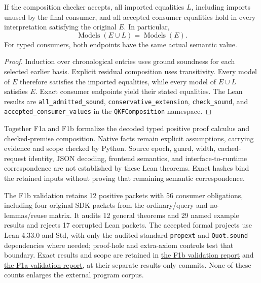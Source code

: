 \begin{theorem}\label{thm:formalcomposition}
If the composition checker accepts, all imported equalities $L$, including imports unused by the final consumer, and all accepted consumer equalities hold in every interpretation satisfying the original $E$. In particular,
\[
 \operatorname{Models}(E\cup L)=\operatorname{Models}(E).
\]
For typed consumers, both endpoints have the same actual semantic value.
\end{theorem}
\begin{proof}
Induction over chronological entries uses ground soundness for each selected earlier basis. Explicit residual composition uses transitivity. Every model of $E$ therefore satisfies the imported equalities, while every model of $E\cup L$ satisfies $E$. Exact consumer endpoints yield their stated equalities. The Lean results are \texttt{all\_admitted\_sound}, \texttt{conservative\_extension}, \texttt{check\_sound}, and \texttt{accepted\_consumer\_values} in the \texttt{QKFComposition} namespace.
\end{proof}

Together F1a and F1b formalize the decoded typed positive proof calculus and checked-premise composition. Native facts remain explicit assumptions, carrying evidence and scope checked by Python. Source epoch, guard, width, cached-request identity, JSON decoding, frontend semantics, and interface-to-runtime correspondence are not established by these Lean theorems. Exact hashes bind the retained inputs without proving that remaining semantic correspondence.

The F1b validation retains 12 positive packets with 56 consumer obligations, including four original SDK packets from the ordinary/query and no-lemmas/reuse matrix. It audits 12 general theorems and 29 named example results and rejects 17 corrupted Lean packets. The accepted formal projects use Lean 4.33.0 and Std, with only the audited standard \texttt{propext} and \texttt{Quot.sound} dependencies where needed; proof-hole and extra-axiom controls test that boundary. Exact results and scope are retained in \href{https://github.com/Len989/QKF-Certifier/blob/ab43bbe11ed99ff5e21808a34351c37915a1ec2f/formal/composition/REPORT_RU.md}{the F1b validation report} and \href{https://github.com/Len989/QKF-Certifier/blob/e210e63dbf19f045f3ad84b528a22810c1fb4d2e/formal/ground/REPORT_RU.md}{the F1a validation report}, at their separate results-only commits. None of these counts enlarges the external program corpus.
